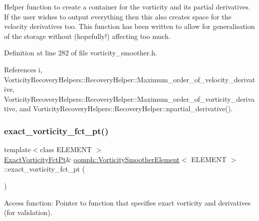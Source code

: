 Helper function to create a container for the vorticity and its partial derivatives. If the user wishes to output everything then this also creates space for the velocity derivatives too. This function has been written to allow for generalisation of the storage without (hopefully!) affecting too much. 



Definition at line 282 of file vorticity\+\_\+smoother.\+h.



References i, Vorticity\+Recovery\+Helpers\+::\+Recovery\+Helper\+::\+Maximum\+\_\+order\+\_\+of\+\_\+velocity\+\_\+derivative, Vorticity\+Recovery\+Helpers\+::\+Recovery\+Helper\+::\+Maximum\+\_\+order\+\_\+of\+\_\+vorticity\+\_\+derivative, and Vorticity\+Recovery\+Helpers\+::\+Recovery\+Helper\+::npartial\+\_\+derivative().

\mbox{\label{classoomph_1_1VorticitySmootherElement_acf41507313bc7171bdaf0f579ab25dd7}} 
\subsubsection{\texorpdfstring{exact\+\_\+vorticity\+\_\+fct\+\_\+pt()}{exact\_vorticity\_fct\_pt()}\hspace{0.1cm}{\footnotesize\ttfamily [1/2]}}
{\footnotesize\ttfamily template$<$class E\+L\+E\+M\+E\+NT $>$ \\
\hyperlink{classoomph_1_1VorticitySmootherElement_ad4ed9d81ba7718bf747e0abdd41cdaa1}{Exact\+Vorticity\+Fct\+Pt}\& \hyperlink{classoomph_1_1VorticitySmootherElement}{oomph\+::\+Vorticity\+Smoother\+Element}$<$ E\+L\+E\+M\+E\+NT $>$\+::exact\+\_\+vorticity\+\_\+fct\+\_\+pt (\begin{DoxyParamCaption}{ }\end{DoxyParamCaption})\hspace{0.3cm}{\ttfamily [inline]}}



Access function\+: Pointer to function that specifies exact vorticity and derivatives (for validation). 



